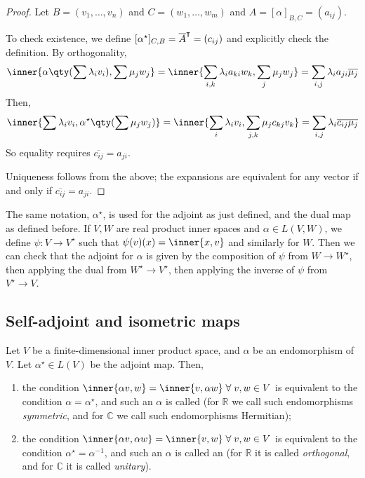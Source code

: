 \begin{proof}
	Let $B = (v_1, \dots, v_n)$ and $C = (w_1, \dots, w_m)$ and $A = [\alpha]_{B, C} = (a_{ij})$.

	To check existence, we define $[\alpha^\star]_{C, B} = \overline{A}^\intercal = (c_{ij})$ and explicitly check the definition.
	By orthogonality,
	\begin{align*}
		\inner{\alpha\qty(\sum \lambda_i v_i), \sum \mu_j w_j} = \inner{\sum_{i,k} \lambda_i a_{ki} w_k, \sum_j \mu_j w_j} = \sum_{i,j} \lambda_i a_{ji} \overline{\mu_j}
	\end{align*}
	Then,
	\begin{align*}
		\inner{\sum \lambda_i v_i, \alpha^\star\qty(\sum \mu_j w_j)} = \inner{\sum_i \lambda_i v_i, \sum_{j,k} \mu_j c_{kj} v_k} = \sum_{i,j} \lambda_i \overline{c_{ij}} \overline{\mu_j}
	\end{align*}
	So equality requires $\overline{c_{ij}} = a_{ji}$.

	Uniqueness follows from the above; the expansions are equivalent for any vector if and only if $\overline{c_{ij}} = a_{ji}$.
\end{proof}

\begin{remark}
	The same notation, $\alpha^\star$, is used for the adjoint as just defined, and the dual map as defined before.
	If $V, W$ are real product inner spaces and $\alpha \in L(V,W)$, we define $\psi \colon V \to V^\star$ such that $\psi(v)(x) = \inner{x,v}$ and similarly for $W$.
	Then we can check that the adjoint for $\alpha$ is given by the composition of $\psi$ from $W \to W^\star$, then applying the dual from $W^\star \to V^\star$, then applying the inverse of $\psi$ from $V^\star \to V$.
\end{remark}

\subsection{Self-adjoint and isometric maps}
\begin{definition}
	Let $V$ be a finite-dimensional inner product space, and $\alpha$ be an endomorphism of $V$.
	Let $\alpha^\star \in L(V)$ be the adjoint map.
	Then,
	\begin{enumerate}
		\item the condition $\inner{\alpha v, w} = \inner{v, \alpha w} \; \forall \; v, w \in V$ is equivalent to the condition $\alpha = \alpha^\star$, and such an $\alpha$ is called  (for $\mathbb R$ we call such endomorphisms \textit{symmetric}, and for $\mathbb C$ we call such endomorphisms Hermitian);
		\item the condition $\inner{\alpha v, \alpha w} = \inner{v, w} \; \forall \; v, w \in V$ is equivalent to the condition $\alpha^\star = \alpha^{-1}$, and such an $\alpha$ is called an  (for $\mathbb R$ it is called \textit{orthogonal}, and for $\mathbb C$ it is called \textit{unitary}).
	\end{enumerate}
\end{definition}

